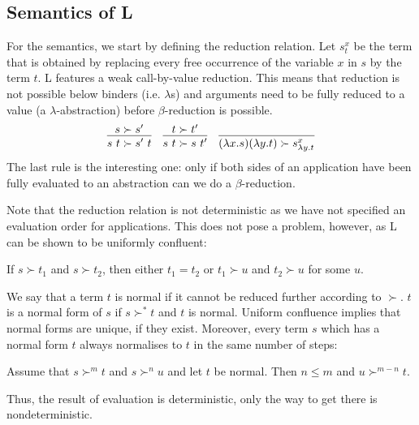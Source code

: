 \subsection{Semantics of L}
For the semantics, we start by defining the reduction relation. Let $s^x_t$ be the term that is obtained by replacing every free occurrence of the variable $x$ in $s$ by the term $t$. 
L features a weak call-by-value reduction. This means that reduction is not possible below binders (i.e. $\lambda$s) and arguments need to be fully reduced to a value (a $\lambda$-abstraction) before $\beta$-reduction is possible.
\begin{align*}
  \infer{s~t \succ s'~t}{s \succ s'} \quad \infer{s~t \succ s~t'}{t \succ t'} \quad \infer{(\lambda x.s)(\lambda y.t) \succ s^x_{\lambda y. t}}{} 
\end{align*}
The last rule is the interesting one: only if both sides of an application have been fully evaluated to an abstraction can we do a $\beta$-reduction. 

Note that the reduction relation is not deterministic as we have not specified an evaluation order for applications. This does not pose a problem, however, as L can be shown to be uniformly confluent: 
\begin{fact}
  If $s \succ t_1$ and $s \succ t_2$, then either $t_1 = t_2$ or $t_1 \succ u$ and $t_2 \succ u$ for some $u$.
\end{fact}
We say that a term $t$ is normal if it cannot be reduced further according to $\succ$. $t$ is a normal form of $s$ if $s \succ^* t$ and $t$ is normal. 
Uniform confluence implies that normal forms are unique, if they exist. Moreover, every term $s$ which has a normal form $t$ always normalises to $t$ in the same number of steps: 
\begin{corollary}
  Assume that $s \succ^m t$ and $s \succ^n u$ and let $t$ be normal. Then $n \le m$ and $u \succ^{m - n} t$.
\end{corollary}
Thus, the result of evaluation is deterministic, only the way to get there is nondeterministic.

